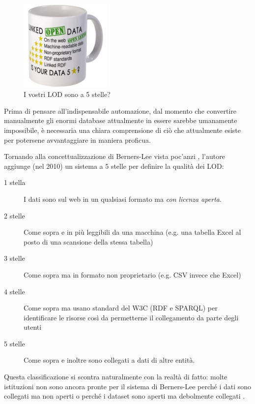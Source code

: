 \begin{figure}
  \vspace{-20pt}
  \begin{center}
    \includegraphics[width=0.4\textwidth]{images/5_star_linked_open_data_mug.jpg}
  \end{center}
  \vspace{-20pt}
  \caption{I vostri LOD sono a 5 stelle? \cite{4}}
  \vspace{-10pt}
\end{figure}

Prima di pensare all'indispensabile automazione, dal momento che convertire manualmente gli enormi database attualmente in essere sarebbe umanamente impossibile, è necessaria una chiara comprensione di ciò che attualmente esiste per potersene avvantaggiare in maniera proficua.

Tornando alla concettualizzazione di Berners-Lee vista poc'anzi \cite{4}, l'autore aggiunge (nel 2010) un sistema a 5 stelle per definire la qualità dei LOD:
\begin{description}
\item[1 stella] I dati sono sul web in un qualsiasi formato ma \emph{con licenza aperta}.
\item[2 stelle] Come sopra e in più leggibili da una macchina (e.g. una tabella Excel al posto di una scansione della stessa tabella)
\item[3 stelle] Come sopra ma in formato non proprietario (e.g. CSV invece che Excel)
\item[4 stelle] Come sopra ma usano standard del W3C (RDF e SPARQL) per identificare le risorse così da permetterne il collegamento da parte degli utenti
\item[5 stelle] Come sopra e inoltre sono collegati a dati di altre entità.
\end{description}

Questa classificazione si scontra naturalmente con la realtà di fatto: molte istituzioni non sono ancora pronte per il sistema di Berners-Lee perché i dati sono collegati ma non aperti o perché i dataset sono aperti ma debolmente collegati \cite{5}.

